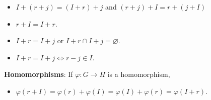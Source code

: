 \documentclass[11pt]{article}
\begin{document}
\begin{itemize}
	\item $I + (r + j) = (I + r) + j$ and $(r + j) + I = r + (j + I)$
	\item $r + I = I + r$.
	\item $I + r = I + j$ or $I + r \cap I + j = \varnothing$.
	\item $I + r = I + j \iff r - j \in I$.
\end{itemize}

\textbf{Homomorphisms}: If $\varphi: G \rightarrow H$ is a homomorphism,

\begin{itemize}
	\item $\varphi(r + I) = \varphi(r) + \varphi(I) = \varphi(I) + \varphi(r) = \varphi(I + r)$.
\end{itemize}
\end{document}
